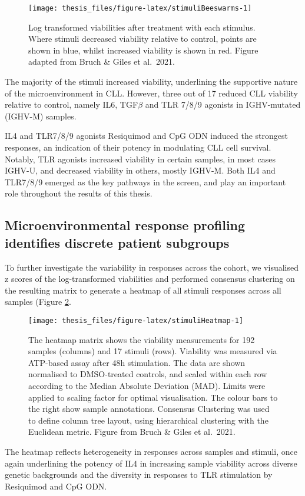 \documentclass[11pt, a4paper, twosided]{book}
\begin{document}
\begin{figure}

{\centering \texttt{[image: thesis\_files/figure-latex/stimuliBeeswarms-1]} 

}

\caption{Log transformed viabilities after treatment with each stimulus. Where stimuli decreased viability relative to control, points are shown in blue, whilst increased viability is shown in red. Figure adapted from Bruch \& Giles et al.~2021.}\label{fig:stimuliBeeswarms}
\end{figure}
The majority of the stimuli increased viability, underlining the supportive nature of the microenvironment in CLL. However, three out of 17 reduced CLL viability relative to control, namely IL6, TGF\(\beta\) and TLR 7/8/9 agonists in IGHV-mutated (IGHV-M) samples.

IL4 and TLR7/8/9 agonists Resiquimod and CpG ODN induced the strongest responses, an indication of their potency in modulating CLL cell survival. Notably, TLR agonists increased viability in certain samples, in most cases IGHV-U, and decreased viability in others, mostly IGHV-M. Both IL4 and TLR7/8/9 emerged as the key pathways in the screen, and play an important role throughout the results of this thesis.

\hypertarget{microenvironmental-response-profiling-identifies-discrete-patient-subgroups}{%
\subsection{Microenvironmental response profiling identifies discrete patient subgroups}\label{microenvironmental-response-profiling-identifies-discrete-patient-subgroups}}

To further investigate the variability in responses across the cohort, we visualised z scores of the log-transformed viabilities and performed consensus clustering on the resulting matrix to generate a heatmap of all stimuli responses across all samples (Figure \ref{fig:stimuliHeatmap}.


\begin{figure}

{\centering \texttt{[image: thesis\_files/figure-latex/stimuliHeatmap-1]} 

}

\caption{The heatmap matrix shows the viability measurements for 192 samples (columns) and 17 stimuli (rows). Viability was measured via ATP-based assay after 48h stimulation. The data are shown normalised to DMSO-treated controls, and scaled within each row according to the Median Absolute Deviation (MAD). Limits were applied to scaling factor for optimal visualisation. The colour bars to the right show sample annotations. Consensus Clustering was used to define column tree layout, using hierarchical clustering with the Euclidean metric. Figure from Bruch \& Giles et al.~2021.}\label{fig:stimuliHeatmap}
\end{figure}
The heatmap reflects heterogeneity in responses across samples and stimuli, once again underlining the potency of IL4 in increasing sample viability across diverse genetic backgrounds and the diversity in responses to TLR stimulation by Resiquimod and CpG ODN.
\end{document}
